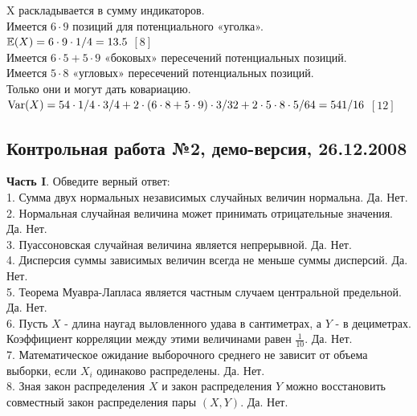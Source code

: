\documentclass[12pt, a4paper]{article}\usepackage[]{graphicx}\usepackage[]{color}
\begin{document}
X раскладывается в сумму индикаторов.\\
Имеется $6\cdot9$ позиций для потенциального «уголка». \\
$\mathbb{E}(X)=6\cdot9\cdot1/4=13.5$ $[8]$ \\
Имеется $6\cdot5+5\cdot9$ «боковых» пересечений потенциальных позиций. \\
Имеется $5\cdot8$ «угловых» пересечений потенциальных позиций. \\
Только они и могут дать ковариацию. \\
$\operatorname{Var}(X)=54\cdot1/4\cdot3/4+2\cdot(6\cdot8+5\cdot9)\cdot3/32+2\cdot5\cdot8\cdot5/64=541/16$ $[12]$\\



\subsection{Контрольная работа №2, демо-версия, 26.12.2008}

\textbf{Часть I}. Обведите верный ответ: \\

1. Сумма двух нормальных независимых случайных величин нормальна.
Да. Нет. \\

2. Нормальная случайная величина может принимать отрицательные
значения. Да. Нет. \\

3. Пуассоновская случайная величина является непрерывной. Да. Нет.
\\

4. Дисперсия суммы зависимых величин всегда не меньше суммы
дисперсий. Да. Нет. \\

5. Теорема Муавра-Лапласа является частным случаем центральной
предельной. Да. Нет. \\

6. Пусть $X$ - длина наугад выловленного удава в сантиметрах, а
$Y$ - в дециметрах. Коэффициент корреляции между этими
величинами равен $\frac{1}{10}$. Да. Нет. \\

7. Математическое ожидание выборочного среднего не зависит от
объема выборки, если $X_{i}$ одинаково распределены. Да. Нет. \\

8. Зная закон распределения $X$ и закон распределения $Y$
можно восстановить совместный закон распределения пары $(X,Y)$. Да. Нет. \\
\end{document}
